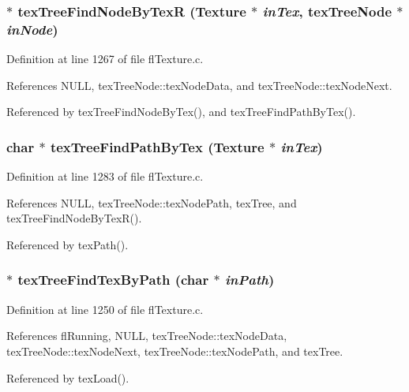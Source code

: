 \subsubsection{ $\ast$ tex\-Tree\-Find\-Node\-By\-Tex\-R ({\bf Texture} $\ast$ {\em in\-Tex}, {\bf tex\-Tree\-Node} $\ast$ {\em in\-Node})}\label{flTexture_8c_bfb1a268a4d1637cf49afc96757acbe8}




Definition at line 1267 of file fl\-Texture.c.

References NULL, tex\-Tree\-Node::tex\-Node\-Data, and tex\-Tree\-Node::tex\-Node\-Next.

Referenced by tex\-Tree\-Find\-Node\-By\-Tex(), and tex\-Tree\-Find\-Path\-By\-Tex().
\subsubsection{\setlength{\rightskip}{0pt plus 5cm}char $\ast$ tex\-Tree\-Find\-Path\-By\-Tex ({\bf Texture} $\ast$ {\em in\-Tex})}\label{flTexture_8c_321b3589d8db12e38592f4622c2c05c1}




Definition at line 1283 of file fl\-Texture.c.

References NULL, tex\-Tree\-Node::tex\-Node\-Path, tex\-Tree, and tex\-Tree\-Find\-Node\-By\-Tex\-R().

Referenced by tex\-Path().
\subsubsection{ $\ast$ tex\-Tree\-Find\-Tex\-By\-Path (char $\ast$ {\em in\-Path})}\label{flTexture_8c_13fd0c5bfa46542ff69ba50c5bd688c4}




Definition at line 1250 of file fl\-Texture.c.

References fl\-Running, NULL, tex\-Tree\-Node::tex\-Node\-Data, tex\-Tree\-Node::tex\-Node\-Next, tex\-Tree\-Node::tex\-Node\-Path, and tex\-Tree.

Referenced by tex\-Load().
